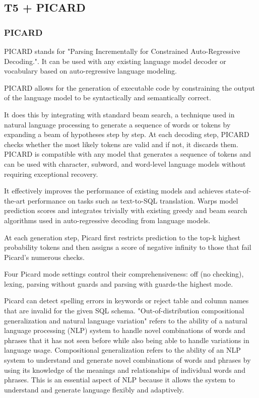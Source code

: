 \clearpage
\subsection{T5 + PICARD} \label{picard}



\subsubsection{PICARD}

PICARD\cite{Scholak2021:PICARD} stands for "Parsing Incrementally for Constrained Auto-Regressive Decoding.". It can be used with any existing language model decoder or vocabulary based on auto-regressive language modeling.

PICARD allows for the generation of executable code by constraining the output of the language model to be syntactically and semantically correct.

It does this by integrating with standard beam search, a technique used in natural language processing to generate a sequence of words or tokens by expanding a beam of hypotheses step by step. At each decoding step, PICARD checks whether the most likely tokens are valid and if not, it discards them. PICARD is compatible with any model that generates a sequence of tokens and can be used with character, subword, and word-level language models without requiring exceptional recovery.

It effectively improves the performance of existing models and achieves state-of-the-art performance on tasks such as text-to-SQL translation.
Warps model prediction scores and integrates trivially with existing greedy and beam search algorithms used in auto-regressive decoding from language models.

At each generation step, Picard first restricts prediction to the top-k highest probability tokens and then assigns a score of negative infinity to those that fail Picard's numerous checks.

Four Picard mode settings control their comprehensiveness: off (no checking), lexing, parsing without guards and parsing with guards-the highest mode.

Picard can detect spelling errors in keywords or reject table and column names that are invalid for the given SQL schema.
"Out-of-distribution compositional generalization and natural language variation" refers to the ability of a natural language processing (NLP) system to handle novel combinations of words and phrases that it has not seen before while also being able to handle variations in language usage.
Compositional generalization refers to the ability of an NLP system to understand and generate novel combinations of words and phrases by using its knowledge of the meanings and relationships of individual words and phrases. This is an essential aspect of NLP because it allows the system to understand and generate language flexibly and adaptively.

